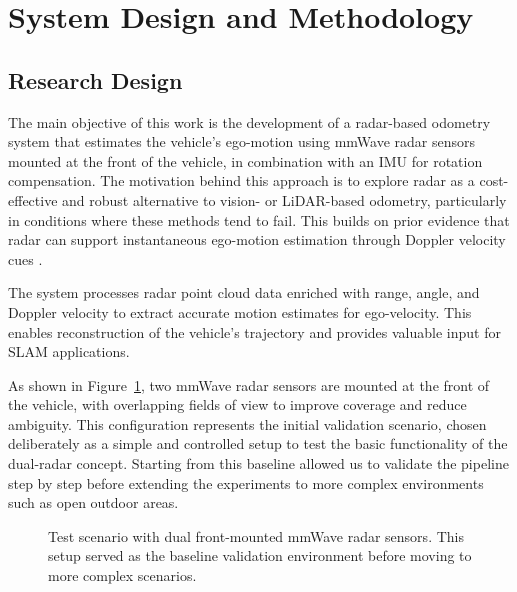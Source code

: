 \section{System Design and Methodology}
\subsection{Research Design}

The main objective of this work is the development of a radar-based odometry system that estimates the vehicle’s ego-motion using mmWave radar sensors mounted at the front of the vehicle, in combination with an IMU for rotation compensation.  
The motivation behind this approach is to explore radar as a cost-effective and robust alternative to vision- or LiDAR-based odometry, particularly in conditions where these methods tend to fail.  
This builds on prior evidence that radar can support instantaneous ego-motion estimation through Doppler velocity cues \cite{EgoMotion_DopplerRadar}.  

The system processes radar point cloud data enriched with range, angle, and Doppler velocity to extract accurate motion estimates for ego-velocity.  
This enables reconstruction of the vehicle’s trajectory and provides valuable input for SLAM applications.  

As shown in Figure~\ref{fig:test_scenario}, two mmWave radar sensors are mounted at the front of the vehicle, with overlapping fields of view to improve coverage and reduce ambiguity.  
This configuration represents the initial validation scenario, chosen deliberately as a simple and controlled setup to test the basic functionality of the dual-radar concept.  
Starting from this baseline allowed us to validate the pipeline step by step before extending the experiments to more complex environments such as open outdoor areas.  

\begin{figure}[!htbp]
    \centering
    \caption{Test scenario with dual front-mounted mmWave radar sensors.  
    This setup served as the baseline validation environment before moving to more complex scenarios.}
    \label{fig:test_scenario}
\end{figure}


